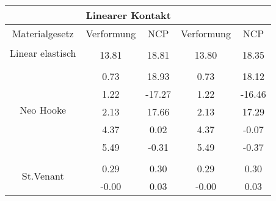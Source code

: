 \begin{table} 
\centering 
\begin{tabular}{c|cc|cc|} 
\cline{2-5} 
 & \multicolumn{2}{|c|}{Linearer Kontakt} &  \\ 
\hline 
\multicolumn{1}{|c|}{Materialgesetz} & \multicolumn{1}{c|}{Verformung} & \multicolumn{1}{c|}{NCP} & \multicolumn{1}{c|}{Verformung} & \multicolumn{1}{c|}{NCP} \\ 
\hline 
\multicolumn{1}{|c|}{\multirow{2}{*}{Linear elastisch}} &\multicolumn{1}{|c|}{} & \multicolumn{1}{|c|}{} & \multicolumn{1}{|c|}{} & \multicolumn{1}{|c|}{} \\ 
\multicolumn{1}{|c|}{} & \multicolumn{1}{|c|}{     13.81} & \multicolumn{1}{|c|}{     18.81} & \multicolumn{1}{|c|}{     13.80} & \multicolumn{1}{|c|}{     18.35} \\ 
\hline 
\multicolumn{1}{|c|}{\multirow{6}{*}{Neo Hooke}} &\multicolumn{1}{|c|}{} & \multicolumn{1}{|c|}{} & \multicolumn{1}{|c|}{} & \multicolumn{1}{|c|}{} \\ 
\multicolumn{1}{|c|}{} & \multicolumn{1}{|c|}{      0.73} & \multicolumn{1}{|c|}{     18.93} & \multicolumn{1}{|c|}{      0.73} & \multicolumn{1}{|c|}{     18.12} \\ 
\multicolumn{1}{|c|}{} & \multicolumn{1}{|c|}{      1.22} & \multicolumn{1}{|c|}{    -17.27} & \multicolumn{1}{|c|}{      1.22} & \multicolumn{1}{|c|}{    -16.46} \\ 
\multicolumn{1}{|c|}{} & \multicolumn{1}{|c|}{      2.13} & \multicolumn{1}{|c|}{     17.66} & \multicolumn{1}{|c|}{      2.13} & \multicolumn{1}{|c|}{     17.29} \\ 
\multicolumn{1}{|c|}{} & \multicolumn{1}{|c|}{      4.37} & \multicolumn{1}{|c|}{      0.02} & \multicolumn{1}{|c|}{      4.37} & \multicolumn{1}{|c|}{     -0.07} \\ 
\multicolumn{1}{|c|}{} & \multicolumn{1}{|c|}{      5.49} & \multicolumn{1}{|c|}{     -0.31} & \multicolumn{1}{|c|}{      5.49} & \multicolumn{1}{|c|}{     -0.37} \\ 
\hline 
\multicolumn{1}{|c|}{\multirow{26}{*}{St.Venant}} &\multicolumn{1}{|c|}{} & \multicolumn{1}{|c|}{} & \multicolumn{1}{|c|}{} & \multicolumn{1}{|c|}{} \\ 
\multicolumn{1}{|c|}{} & \multicolumn{1}{|c|}{      0.29} & \multicolumn{1}{|c|}{      0.30} & \multicolumn{1}{|c|}{      0.29} & \multicolumn{1}{|c|}{      0.30} \\ 
\multicolumn{1}{|c|}{} & \multicolumn{1}{|c|}{     -0.00} & \multicolumn{1}{|c|}{      0.03} & \multicolumn{1}{|c|}{     -0.00} & \multicolumn{1}{|c|}{      0.03} \\ 

\end{tabular}
\end{table}
